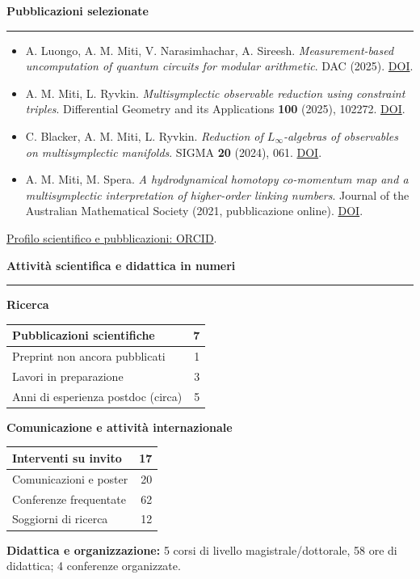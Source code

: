 \documentclass[10pt,a4paper]{article}
\newcommand{\cvsection}[1]{%
    \Needspace{4\baselineskip}%
    \vspace{0.8em}%
    {\large\bfseries\color{accent} #1}\par
    \vspace{0.2em}\hrule\vspace{0.45em}%
}
\begin{document}
\cvsection{Pubblicazioni selezionate}
\begin{itemize}[itemsep=4pt]
    \item A. Luongo, A. M. Miti, V. Narasimhachar, A. Sireesh.
    \emph{Measurement-based uncomputation of quantum circuits for modular arithmetic}.
    DAC (2025).
    \href{https://doi.org/10.1109/DAC63849.2025.11132981}{DOI}.
    \item A. M. Miti, L. Ryvkin.
    \emph{Multisymplectic observable reduction using constraint triples}.
    Differential Geometry and its Applications \textbf{100} (2025), 102272.
    \href{https://doi.org/10.1016/j.difgeo.2025.102272}{DOI}.
    \item C. Blacker, A. M. Miti, L. Ryvkin.
    \emph{Reduction of $L_\infty$-algebras of observables on multisymplectic manifolds}.
    SIGMA \textbf{20} (2024), 061.
    \href{https://doi.org/10.3842/SIGMA.2024.061}{DOI}.
    \item A. M. Miti, M. Spera.
    \emph{A hydrodynamical homotopy co-momentum map and a multisymplectic interpretation of higher-order linking numbers}.
    Journal of the Australian Mathematical Society (2021, pubblicazione online).
    \href{https://doi.org/10.1017/S1446788720000518}{DOI}.
\end{itemize}
\href{https://orcid.org/0000-0002-8829-1943}{Profilo scientifico e pubblicazioni: ORCID}.\par

\cvsection{Attività scientifica e didattica in numeri}
\begin{minipage}[t]{0.48\textwidth}
\textbf{Ricerca}\par\vspace{3pt}
\begin{tabularx}{\linewidth}{|>{\raggedright\arraybackslash}X|r|}
\hline
Pubblicazioni scientifiche & 7 \\ \hline
Preprint non ancora pubblicati & 1 \\ \hline
Lavori in preparazione & 3 \\ \hline
Anni di esperienza postdoc (circa) & 5 \\ \hline
\end{tabularx}
\end{minipage}\hfill
\begin{minipage}[t]{0.48\textwidth}
\textbf{Comunicazione e attività internazionale}\par\vspace{3pt}
\begin{tabularx}{\linewidth}{|>{\raggedright\arraybackslash}X|r|}
\hline
Interventi su invito & 17 \\ \hline
Comunicazioni e poster & 20 \\ \hline
Conferenze frequentate & 62 \\ \hline
Soggiorni di ricerca & 12 \\ \hline
\end{tabularx}
\end{minipage}
\par\vspace{5pt}
\textbf{Didattica e organizzazione:} 5 corsi di livello magistrale/dottorale, 58 ore di didattica; 4 conferenze organizzate.
\end{document}
